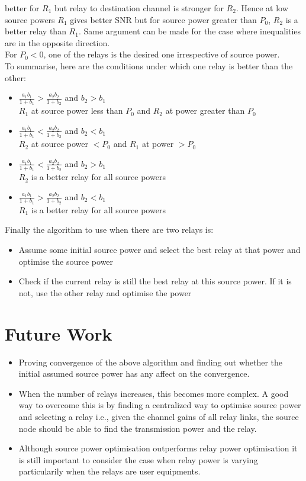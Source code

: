\documentclass[conference]{IEEEtran}
\begin{document}
better for $R_1$ but relay to destination channel is stronger
for $R_2$. Hence at low source powers $R_1$ gives
better SNR but for  source power greater than  $P_0$, $R_2$ 
is a better relay than $R_1$. Same argument can be made 
for the case where inequalities are in the opposite
direction. 
\\
For $P_0 < 0$, one of the relays is the desired one irrespective of source power.
\\
To summarise, here are the conditions under which one relay is better than the other:
\begin{itemize}
	\item $\frac{a_1b_1}{1+b_1} >	\frac{a_2b_2}{1+b_2}$ and $b_2 > b_1$ \\
		$R_1$ at source power less than  $P_0$ and $R_2$ at power greater than $P_0$
	\item $\frac{a_1b_1}{1+b_1} < \frac{a_2b_2}{1+b_2}$ and $b_2 < b_1$ \\
		$R_2$ at source power $<P_0$ and $R_1$ at power $>P_0$
	\item $\frac{a_1b_1}{1+b_1} < \frac{a_2b_2}{1+b_2}$ and $b_2 > b_1$ \\
		$R_2$ is a better relay for all source powers
	\item $\frac{a_1b_1}{1+b_1} >	\frac{a_2b_2}{1+b_2}$ and $b_2 < b_1$ \\
		$R_1$ is a better relay for all source powers
\end{itemize}
Finally the algorithm to use when there are two relays is:
\begin{itemize}
	\item Assume some initial source power and select the best relay at that power and optimise the source power
	\item Check if the current relay is still the best relay at this source power. If it is	not, use the other relay and optimise the power
\end{itemize}
\section{Future Work}
\begin{itemize}
	\item Proving convergence of the above algorithm and finding out whether the
		initial assumed source power has any affect on the convergence.
	\item When the number of relays increases, this becomes more complex. A good 
		way to overcome this is by finding a centralized way to optimise 
		source power and selecting a relay i.e., given the channel gains of all relay
		links, the source node should be able to find the transmission power and 
		the relay.
	\item Although source power optimisation outperforms relay power optimisation
		it is still important to consider the case when relay power is varying
		particularily when the relays are user equipments.

\end{itemize}
\end{document}
